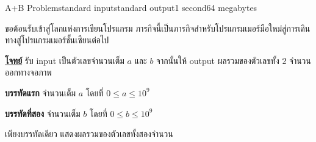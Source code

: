 \documentclass[11pt,a4paper]{article}
\begin{document}
\begin{problem}{A+B Problem}{standard input}{standard output}{1 second}{64 megabytes}

ขอต้อนรับเข้าสู่โลกแห่งการเขียนโปรแกรม ภารกิจนี้เป็นภารกิจสำหรับโปรแกรมเมอร์มือใหม่สู่การเดินทางสู่โปรแกรมเมอร์ชั้นเซียนต่อไป

\underline{\textbf{โจทย์}} รับ input เป็นตัวเลขจำนวนเต็ม $a$ และ $b$ จากนั้นให้ output ผลรวมของตัวเลขทั้ง $2$ จำนวนออกทางจอภาพ

\InputFile

\textbf{บรรทัดแรก} จำนวนเต็ม $a$ โดยที่ $0 \leq a \leq 10^9$

\textbf{บรรทัดที่สอง} จำนวนเต็ม $b$ โดยที่ $0 \leq b \leq 10^9$

\OutputFile

เพียงบรรทัดเดียว แสดงผลรวมของตัวเลขทั้งสองจำนวน

\Examples

\begin{example}
%
\end{example}

\end{problem}
\end{document}
